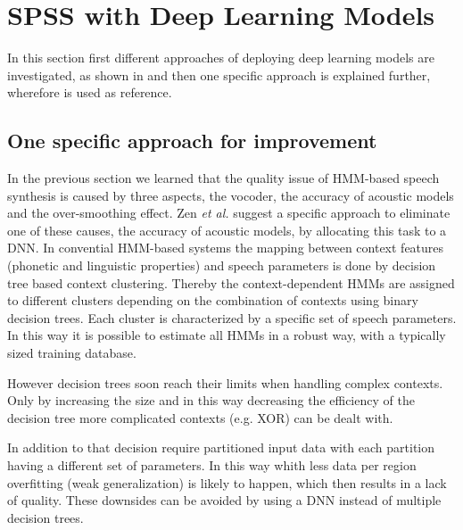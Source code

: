 
\section{\ac{SPSS} with Deep Learning Models}
\label{sec:deepspeech}

{\color{ACMRed}In this section first different approaches of deploying deep learning models are investigated, as shown in \cite{hashimoto:effect} and then one specific approach is explained further, wherefore \cite{zen:deepstatistical} is used as reference.}

\subsection{One specific approach for improvement}
\label{subsec:deepspss}

In the previous section we learned that the quality issue of \ac{HMM}-based speech synthesis is caused by three aspects, the vocoder, the accuracy of acoustic models and the over-smoothing effect. Zen \textit{et al.} \cite{zen:deepstatistical} suggest a specific approach to eliminate one of these causes, the accuracy of acoustic models, by allocating this task to a \ac{DNN}. In convential \ac{HMM}-based systems the mapping between context features (phonetic and linguistic properties) and speech parameters is done by decision tree based context clustering. Thereby the context-dependent \acp{HMM} are assigned to different clusters depending on the combination of contexts using binary decision trees. Each cluster is characterized by a specific set of speech parameters. In this way it is possible to estimate all \acp{HMM} in a robust way, with a typically sized training database.

However decision trees soon reach their limits when handling complex contexts. Only by increasing the size and in this way decreasing the efficiency of the decision tree more complicated contexts (e.g. XOR) can be dealt with. 

In addition to that decision require partitioned input data with each partition having a different set of parameters. In this way whith less data per region overfitting (weak generalization) is likely to happen, which then results in a lack of quality. These downsides can be avoided by using a \ac{DNN} instead of multiple decision trees.

